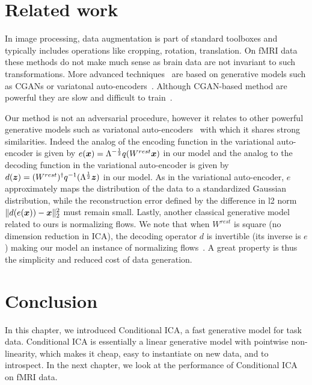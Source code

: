\section{Related work}
In image processing, data augmentation is part of standard toolboxes and
typically includes operations like cropping, rotation, translation.
%
On fMRI data these methods do not make much sense as brain data are not invariant to such transformations.
%
More advanced techniques~\cite{zhuang2019fmri} %
are based on generative models such as CGANs or variatonal
auto-encoders~\cite{kingma2013auto}. Although CGAN-based method are powerful they are slow and difficult to train~\cite{arjovsky_wasserstein_2017}.

Our method is not an adversarial procedure, however it relates to other
powerful generative models such as variatonal
auto-encoders~\cite{kingma2013auto} with which it shares strong similarities.
Indeed the analog of the encoding function in the variational auto-encoder is
given by $e(\boldsymbol{x}) = \Lambda^{-\frac12}q(W^{rest} \boldsymbol{x})$ in our model and the analog to the decoding
function in the variational auto-encoder is given by $d(\boldsymbol{z}) =
(W^{rest})^{\dagger}q^{-1}(\Lambda^{\frac12}\boldsymbol{z})$ in our model. As in the variational auto-encoder, $e$ approximately maps the distribution of the data to a standardized Gaussian distribution,
while the reconstruction error defined by the difference in l2 norm
$\|d(e(\boldsymbol{x})) - \boldsymbol{x}\|^2_2$ must remain small.
Lastly, another classical generative model related to ours is normalizing
flows.  We note that when $W^{rest}$ is square (no dimension reduction in ICA), the decoding operator $d$ is invertible (its inverse is $e$) making our
model an instance of normalizing flows~\cite{rezende2015variational}. 
%
A great property is thus the simplicity and reduced cost of data generation.

\section{Conclusion}
In this chapter, we introduced Conditional ICA, a fast generative model for task
data.
Conditional ICA is essentially a linear generative model with
pointwise non-linearity, which makes it cheap, easy to instantiate on new data,
and to introspect.
In the next chapter, we look at the performance of Conditional ICA on fMRI data.

